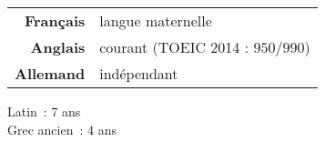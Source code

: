 
\begin{tabularx}{\textwidth}{@{}d X@{}}
  \textbf{Français} & langue maternelle\\
  \textbf{Anglais} & courant (\textcolor{english}{TOEIC 2014 : $950 / 990$})\\
  \textbf{Allemand} & indépendant\\
\end{tabularx}

\vspace{0.5pt}

{\small
  Latin~: 7 ans\\
  Grec ancien~: 4 ans}

